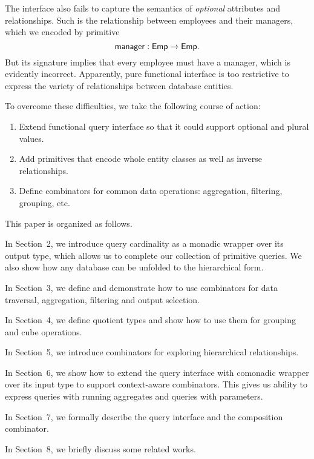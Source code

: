 The interface also fails to capture the semantics of \emph{optional} attributes
and relationships.  Such is the relationship between employees and their
managers, which we encoded by primitive
\begin{equation*}
    \textup{\textsf{manager}}: \textup{\textsf{Emp}} \to \textup{\textsf{Emp}}.
\end{equation*}
But its signature implies that every employee must have a manager, which is
evidently incorrect.  Apparently, pure functional interface is too restrictive
to express the variety of relationships between database entities.

To overcome these difficulties, we take the following course of action:
\begin{enumerate}
\item
Extend functional query interface so that it could support optional and plural
values.
\item
Add primitives that encode whole entity classes as well as inverse
relationships.
\item
Define combinators for common data operations: aggregation, filtering,
grouping, etc.
\end{enumerate}

This paper is organized as follows.

In Section~2, we introduce query cardinality as a mo\-nadic wrapper over its
output type, which allows us to complete our collection of primitive queries.
We also show how any database can be unfolded to the hierarchical form.

In Section~3, we define and demonstrate how to use combinators for data
traversal, aggregation, filtering and output selection.

In Section~4, we define quotient types and show how to use them for
grouping and cube operations.

In Section~5, we introduce combinators for exploring hierarchical
relationships.

In Section~6, we show how to extend the query interface with comonadic wrapper
over its input type to support context-aware combinators.  This gives us
ability to express queries with running aggregates and queries with parameters.

In Section~7, we formally describe the query interface and the composition
combinator.

In Section~8, we briefly discuss some related works.

